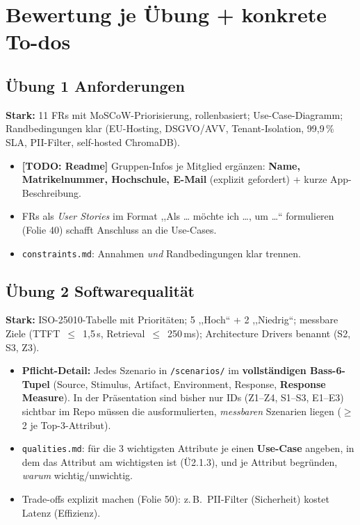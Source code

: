 \documentclass[11pt,a4paper]{article}
\newcommand{\todo}[1]{\textcolor{bad}{\textbf{[TODO: #1]}}}
\begin{document}
\section{Bewertung je \"Ubung + konkrete To-dos}

\subsection*{\"Ubung 1 \textendash{} Anforderungen}
\textbf{Stark:} 11 FRs mit MoSCoW-Priorisierung, rollenbasiert; Use-Case-Diagramm;
Randbedingungen klar (EU-Hosting, DSGVO/AVV, Tenant-Isolation, 99,9\,\% SLA,
PII-Filter, self-hosted ChromaDB).
\begin{itemize}
  \item \todo{Readme} Gruppen-Infos je Mitglied erg\"anzen: \textbf{Name,
        Matrikelnummer, Hochschule, E-Mail} (explizit gefordert) + kurze
        App-Beschreibung.
  \item FRs als \emph{User Stories} im Format ,,Als \dots{} m\"ochte ich \dots{},
        um \dots`` formulieren (Folie 40) \textendash{} schafft Anschluss an die
        Use-Cases.
  \item \texttt{constraints.md}: Annahmen \emph{und} Randbedingungen klar trennen.
\end{itemize}

\subsection*{\"Ubung 2 \textendash{} Softwarequalit\"at}
\textbf{Stark:} ISO-25010-Tabelle mit Priorit\"aten; 5 ,,Hoch`` + 2 ,,Niedrig``;
messbare Ziele (TTFT~$\leq$~1,5\,s, Retrieval~$\leq$~250\,ms); Architecture Drivers
benannt (S2, S3, Z3).
\begin{itemize}
  \item \textbf{Pflicht-Detail:} Jedes Szenario in \texttt{/scenarios/} im
        \textbf{vollst\"andigen Bass-6-Tupel} (Source, Stimulus, Artifact,
        Environment, Response, \textbf{Response Measure}). In der Pr\"asentation
        sind bisher nur IDs (Z1--Z4, S1--S3, E1--E3) sichtbar \textendash{} im Repo
        m\"ussen die ausformulierten, \emph{messbaren} Szenarien liegen
        ($\geq$2 je Top-3-Attribut).
  \item \texttt{qualities.md}: f\"ur die 3 wichtigsten Attribute je einen
        \textbf{Use-Case} angeben, in dem das Attribut am wichtigsten ist
        (\"U2.1.3), und je Attribut begr\"unden, \emph{warum} wichtig/unwichtig.
  \item Trade-offs explizit machen (Folie 50): z.\,B.\ PII-Filter (Sicherheit)
        kostet Latenz (Effizienz).
\end{itemize}
\end{document}
